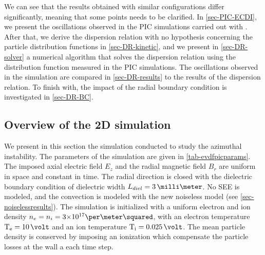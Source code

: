     \vspace{1ex}
    We can see that the results obtained with similar configurations differ significantly, meaning that some points needs to be clarified.
    In \cref{sec-PIC-ECDI}, we present the oscillations observed in the \ac{PIC} simulations carried out with \LPPic.
    After that, we derive the dispersion relation with no hypothesis concerning the particle distribution functions in \cref{sec-DR-kinetic}, and we present in \cref{sec-DR-solver} a numerical algorithm that solves the dispersion relation using the distribution function measured in the \ac{PIC} simulations.
    The oscillations observed in the simulation are compared in \cref{sec-DR-results} to the results of the dispersion relation.
    To finish with, the impact of the radial boundary condition is investigated in \cref{sec-DR-BC}.


  \subsection{Overview of the 2D simulation} \label{subsec-lppic_ECDI}
  
  
  We present in this section the simulation conducted to study the azimuthal instability.
  The parameters of the simulation are given in \cref{tab-evdfpicparams}.
  The imposed axial electric field $E_z$ and the radial magnetic field $B_r$ are uniform in space and constant in time.
  The radial direction is closed with the dielectric boundary condition of dielectric width $L_{diel}=3\,\milli\meter$.
  No \ac{SEE} is modeled, and the convection is modeled with the new noiseless model (see \cref{sec-noiselessresults}).
  The simulation is initialized with a uniform electron and ion density $n_e = n_i = \sn{3}{17}\per\meter\squared$, with an electron temperature $\Te=10\,\volt$ and an ion temperature $\Ti=0.025\,\volt$.
  The mean particle density is conserved by imposing an ionization  which compensate the particle losses at the wall a each time step.
  
